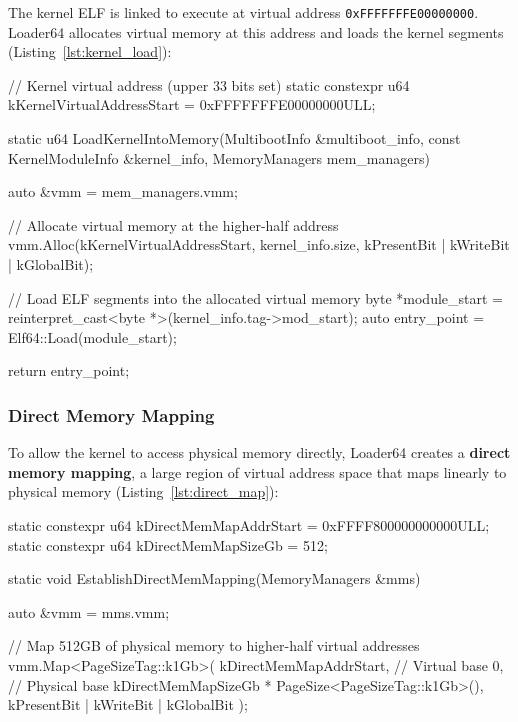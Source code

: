 \documentclass[a4paper,10pt,twoside]{report}
\theoremstyle{definition}
\begin{document}
The kernel ELF is linked to execute at virtual address \texttt{0xFFFFFFFE00000000}. Loader64 allocates virtual memory at this address and loads the kernel segments (Listing~\ref{lst:kernel_load}):

\begin{cppcode}[caption={Higher-Half Kernel Loading (main.cpp)}, label={lst:kernel_load}]
// Kernel virtual address (upper 33 bits set)
static constexpr u64 kKernelVirtualAddressStart = 0xFFFFFFFE00000000ULL;

static u64 LoadKernelIntoMemory(MultibootInfo &multiboot_info,
                                const KernelModuleInfo &kernel_info,
                                MemoryManagers mem_managers) {
    auto &vmm = mem_managers.vmm;
    
    // Allocate virtual memory at the higher-half address
    vmm.Alloc(kKernelVirtualAddressStart, 
              kernel_info.size,
              kPresentBit | kWriteBit | kGlobalBit);
    
    // Load ELF segments into the allocated virtual memory
    byte *module_start = reinterpret_cast<byte *>(kernel_info.tag->mod_start);
    auto entry_point = Elf64::Load(module_start);
    
    return entry_point;
}
\end{cppcode}

\subsubsection{Direct Memory Mapping}

To allow the kernel to access physical memory directly, Loader64 creates a \textbf{direct memory mapping}, a large region of virtual address space that maps linearly to physical memory (Listing~\ref{lst:direct_map}):

\begin{cppcode}[caption={Direct Memory Mapping Setup (main.cpp)}, label={lst:direct_map}]
static constexpr u64 kDirectMemMapAddrStart = 0xFFFF800000000000ULL;
static constexpr u64 kDirectMemMapSizeGb = 512;

static void EstablishDirectMemMapping(MemoryManagers &mms) {
    auto &vmm = mms.vmm;
    
    // Map 512GB of physical memory to higher-half virtual addresses
    vmm.Map<PageSizeTag::k1Gb>(
        kDirectMemMapAddrStart,                        // Virtual base
        0,                                             // Physical base
        kDirectMemMapSizeGb * PageSize<PageSizeTag::k1Gb>(),
        kPresentBit | kWriteBit | kGlobalBit
    );
}
\end{cppcode}
\end{document}
